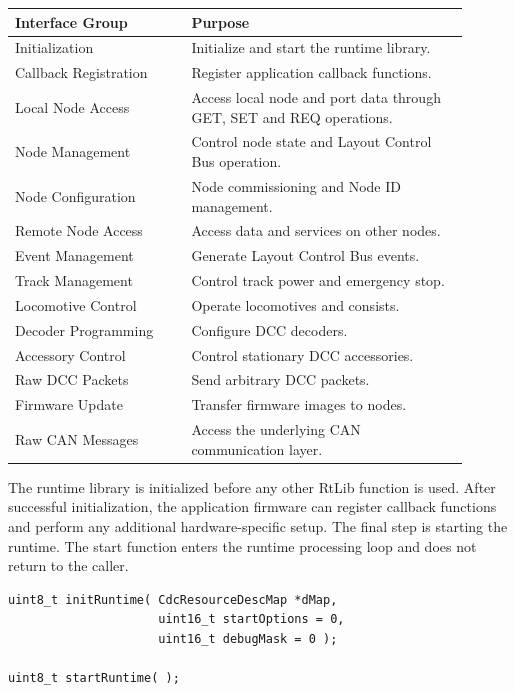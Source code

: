 \begin{longtable}{|p{0.35\linewidth}|p{0.55\linewidth}|}
\hline
\textbf{Interface Group} & \textbf{Purpose} \\
\hline
Initialization & Initialize and start the runtime library.\\
\hline
Callback Registration & Register application callback functions.\\
\hline
Local Node Access & Access local node and port data through GET, SET and REQ operations.\\
\hline
Node Management & Control node state and Layout Control Bus operation.\\
\hline
Node Configuration & Node commissioning and Node ID management.\\
\hline
Remote Node Access & Access data and services on other nodes.\\
\hline
Event Management & Generate Layout Control Bus events.\\
\hline
Track Management & Control track power and emergency stop.\\
\hline
Locomotive Control & Operate locomotives and consists.\\
\hline
Decoder Programming & Configure DCC decoders.\\
\hline
Accessory Control & Control stationary DCC accessories.\\
\hline
Raw DCC Packets & Send arbitrary DCC packets.\\
\hline
Firmware Update & Transfer firmware images to nodes.\\
\hline
Raw CAN Messages & Access the underlying CAN communication layer.\\
\hline
\end{longtable}


The runtime library is initialized before any other RtLib function is used. 
After successful initialization, the application firmware can register callback 
functions and perform any additional hardware-specific setup. The final step is 
starting the runtime. The start function enters the runtime processing loop and 
does not return to the caller.

\begin{lstlisting}[style=api-interface]
uint8_t initRuntime( CdcResourceDescMap *dMap, 
                     uint16_t startOptions = 0,
                     uint16_t debugMask = 0 );

uint8_t startRuntime( );
\end{lstlisting}

